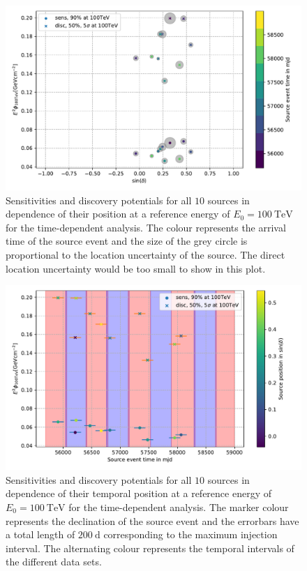 \begin{figure}
    \centering
    \includegraphics[width=\linewidth]{Plots/05_csky/time_dep_sens_disc_dec_time.pdf}
    \caption{Sensitivities and discovery potentials for all $\num{10}$ sources in dependence of their position at a reference energy of $E_0 = \SI{100}{\tera\electronvolt}$ for the time-dependent analysis. The colour represents the arrival time of the source event and the size of the grey circle is proportional to the location uncertainty of the source. The direct location uncertainty would be too small to show in this plot.}
    \label{fig:sources_and_datasets}
\end{figure}
\begin{figure}
    \centering
    \includegraphics[width=\linewidth]{Plots/05_csky/time_dep_sens_disc_time.pdf}
    \caption{Sensitivities and discovery potentials for all $\num{10}$ sources in dependence of their temporal position at a reference energy of $E_0 = \SI{100}{\tera\electronvolt}$ for the time-dependent analysis. The marker colour represents the declination of the source event and the errorbars have a total length of $\SI{200}{\day}$ corresponding to the maximum injection interval. The alternating colour represents the temporal intervals of the different data sets.}
    \label{fig:sens_disc_time_dep_dec}
\end{figure}

